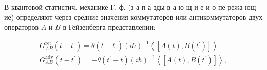 \documentclass[10pt]{article}
\begin{document}
В квантовой статистич. механике Г. ф. (з а п а зды в а ю щ и е и о пе режа ющ ие) определяют через средние значения коммутаторов или антикоммутаторов двух операторов $A$ и $B$ в Гейзенберга представлении:



\[

\begin{gathered}

G_{A B}^{\mathrm{ret}}\left(t-t^{\prime}\right)=\theta\left(t-t^{\prime}\right)(i \hbar)^{-1}\left\langle\left[A(t), B\left(t^{\prime}\right)\right]\right\rangle \\

G_{A B}^{\mathrm{adv}}\left(t-t^{\prime}\right)=-\theta\left(t^{\prime}-t\right)(i \hbar)^{-1}\left\langle\left[A(t), B\left(t^{\prime}\right)\right]\right\rangle,

\end{gathered}

\]
\end{document}
